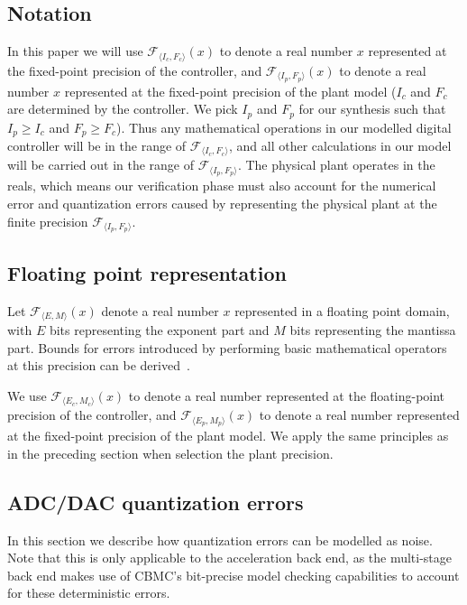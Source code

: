 \documentclass[twocolumn]{autart}    %
\begin{document}
\subsection{Notation}
In this paper we will use $\mathcal{F}_{\langle I_c,F_c \rangle}(x)$ to denote a real
number $x$ represented at the fixed-point precision of the controller, and
$\mathcal{F}_{\langle I_p,F_p \rangle}(x)$ to denote a real number $x$
represented at the fixed-point precision of the plant model ($I_c$ and $F_c$
are determined by the controller.  We pick $I_p$ and $F_p$ for our synthesis
such that $I_p \geq I_c$ and $\allowbreak F_p \geq F_c$).  Thus any
mathematical operations in our modelled digital controller will be in the
range of $\mathcal{F}_{\langle I_c,F_c \rangle}$, and all other calculations
in our model will be carried out in the range of $\mathcal{F}_{\langle
I_p,F_p \rangle}$.  The physical plant operates in the reals, which means
our verification phase must also account for the numerical error and
quantization errors caused by representing the physical plant at the finite
precision $\mathcal{F}_{\langle I_p,F_p \rangle}$.

\subsection{Floating point representation}

Let $\mathcal{F}_{\langle E,M \rangle}(x)$ denote a real number $x$
represented in a floating point domain, with $E$ bits representing the exponent
part and $M$ bits representing the mantissa part. Bounds for errors introduced by performing basic mathematical operators at this precision can be derived~\cite{DBLP:conf/arith/BrainTRW15}.

We use $\mathcal{F}_{\langle E_c,M_c \rangle}(x)$ to denote a real number represented at the floating-point precision of the controller, and $\mathcal{F}_{\langle E_p,M_p \rangle}(x)$ to denote a real number represented at the fixed-point precision of the plant model. We apply the same principles as in the preceding section when selection the plant precision.

\subsection{ADC/DAC quantization errors} 
In this section we describe how quantization errors can be modelled as noise. Note that this is only applicable to the acceleration back end, as the multi-stage back end makes use of CBMC's bit-precise model checking capabilities to account for these deterministic errors.
\end{document}
